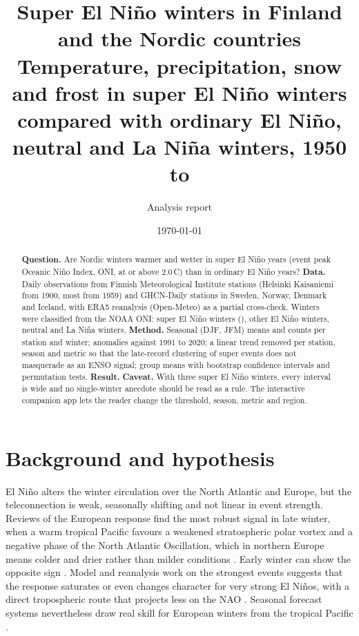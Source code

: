 \documentclass[11pt,a4paper]{article}
\title{\textbf{Super El Niño winters in Finland and the Nordic countries}\\[4pt]
\large Temperature, precipitation, snow and frost in super El Niño winters compared with ordinary El Niño, neutral and La Niña winters, 1950 to \lastWinter}
\author{Analysis report}
\date{\today}
\newcommand{\degC}{\textdegree{}C}
\begin{document}
\maketitle

\begin{abstract}
\noindent\textbf{Question.} Are Nordic winters warmer and wetter in super El Niño years (event peak Oceanic Niño Index, ONI, at or above 2.0\,\degC) than in ordinary El Niño years?
\textbf{Data.} Daily observations from \nStationsFI{} Finnish Meteorological Institute stations (Helsinki Kaisaniemi from 1900, most from 1959) and \nStationsGHCN{} GHCN-Daily stations in Sweden, Norway, Denmark and Iceland, with ERA5 reanalysis (Open-Meteo) as a partial cross-check. Winters were classified from the NOAA ONI: \nSuper{} super El Niño winters (\superWinters), \nElnino{} other El Niño winters, \nNeutral{} neutral and \nLanina{} La Niña winters.
\textbf{Method.} Seasonal (DJF, JFM) means and counts per station and winter; anomalies against 1991 to 2020; a linear trend removed per station, season and metric so that the late-record clustering of super events does not masquerade as an ENSO signal; group means with bootstrap confidence intervals and permutation tests.
\textbf{Result.} 
\textbf{Caveat.} With three super El Niño winters, every interval is wide and no single-winter anecdote should be read as a rule. The interactive companion app lets the reader change the threshold, season, metric and region.
\end{abstract}

\section{Background and hypothesis}

El Niño alters the winter circulation over the North Atlantic and Europe, but the teleconnection is weak, seasonally shifting and not linear in event strength. Reviews of the European response find the most robust signal in late winter, when a warm tropical Pacific favours a weakened stratospheric polar vortex and a negative phase of the North Atlantic Oscillation, which in northern Europe means colder and drier rather than milder conditions \cite{bronnimann2007,ineson2009,bell2009,domeisen2019}. Early winter can show the opposite sign \cite{bronnimann2007}. Model and reanalysis work on the strongest events suggests that the response saturates or even changes character for very strong El Niños, with a direct tropospheric route that projects less on the NAO \cite{toniazzo2006,hardiman2019}. Seasonal forecast systems nevertheless draw real skill for European winters from the tropical Pacific \cite{scaife2014}.
\end{document}

